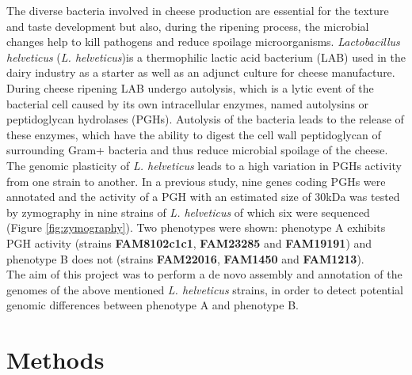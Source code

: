 \documentclass[10pt,a4paper]{article}
\begin{document}
The diverse bacteria involved in cheese production are essential for the texture and taste development but also, during the ripening process, the microbial changes help to kill pathogens and reduce spoilage microorganisms. \textit{Lactobacillus helveticus} (\textit{L. helveticus})is a thermophilic lactic acid bacterium (LAB) used in the dairy industry as a starter as well as an adjunct culture for cheese manufacture\cite{kongo_lactic_2013}. During cheese ripening LAB undergo autolysis, which is a lytic event of the bacterial cell caused by its own intracellular enzymes, named autolysins or peptidoglycan hydrolases (PGHs)\cite{delcour_biosynthesis_1999}. Autolysis of the bacteria leads to the release of these enzymes, which have the ability to digest the cell wall peptidoglycan of surrounding Gram+ bacteria and thus reduce microbial spoilage of the cheese\cite{jebava_nine_2011}. The genomic plasticity of \textit{L. helveticus} leads to a high variation in PGHs activity from one strain to another. In a previous study\cite{jebava_nine_2011}, nine genes coding PGHs were annotated and the activity of a PGH with an estimated size of 30kDa was tested by zymography in nine strains of \textit{L. helveticus} of which six were sequenced (Figure \ref{fig:zymography}). Two phenotypes were shown: phenotype A exhibits PGH activity (strains \textbf{FAM8102c1c1}, \textbf{FAM23285} and \textbf{FAM19191}) and phenotype B does not (strains \textbf{FAM22016}, \textbf{FAM1450} and \textbf{FAM1213}).\\


\noindent The aim of this project was to perform a de novo assembly and annotation of the genomes of the above mentioned \textit{L. helveticus} strains, in order to detect potential genomic differences between phenotype A and phenotype B.

\section*{\large Methods}
\end{document}
